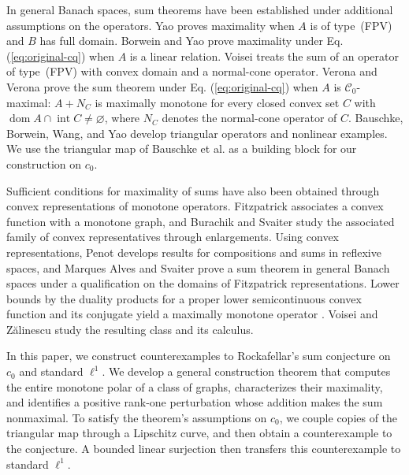 \documentclass[11pt]{article}
\newcommand{\dom}{\operatorname{dom}}
\theoremstyle{definition}
\theoremstyle{remark}
\begin{document}
In general Banach spaces, sum theorems have been established under additional assumptions on the operators. Yao \cite{yao2010} proves maximality when $A$ is of type~(FPV) and $B$ has full domain. Borwein and Yao \cite{borweinyao2012} prove maximality under Eq. (\ref{eq:original-cq}) when $A$ is a linear relation. Voisei \cite{voisei2010} treats the sum of an operator of type~(FPV) with convex domain and a normal-cone operator. Verona and Verona \cite[Main Result~1.1(b)]{veronaverona2022} prove the sum theorem under Eq. (\ref{eq:original-cq}) when $A$ is $\mathcal C_0$-maximal: $A+N_C$ is maximally monotone for every closed convex set $C$ with $\dom A\cap\operatorname{int}C\ne\varnothing$, where $N_C$ denotes the normal-cone operator of $C$. Bauschke, Borwein, Wang, and Yao \cite{bauschkeetal2011} develop triangular operators and nonlinear examples. We use the triangular map of Bauschke et al. as a building block for our construction on $c_0$.

Sufficient conditions for maximality of sums have also been obtained through convex representations of monotone operators. Fitzpatrick \cite{fitzpatrick1988} associates a convex function with a monotone graph, and Burachik and Svaiter \cite{burachiksvaiter2002} study the associated family of convex representatives through enlargements. Using convex representations, Penot \cite{penot2004} develops results for compositions and sums in reflexive spaces, and Marques Alves and Svaiter \cite{marquessvaiter2012} prove a sum theorem in general Banach spaces under a qualification on the domains of Fitzpatrick representations. Lower bounds by the duality products for a proper lower semicontinuous convex function and its conjugate yield a maximally monotone operator \cite{marquesalvessvaiter2008br}. Voisei and Z\u{a}linescu \cite{voiseizalinescu2009} study the resulting class and its calculus.



In this paper, we construct counterexamples to Rockafellar's sum conjecture on $c_0$ and standard $\ell^1$. We develop a general construction theorem that computes the entire monotone polar of a class of graphs, characterizes their maximality, and identifies a positive rank-one perturbation whose addition makes the sum nonmaximal. To satisfy the theorem's assumptions on $c_0$, we couple copies of the triangular map through a Lipschitz curve, and then obtain a counterexample to the conjecture. A bounded linear surjection then transfers this counterexample to standard $\ell^1$.
\end{document}
